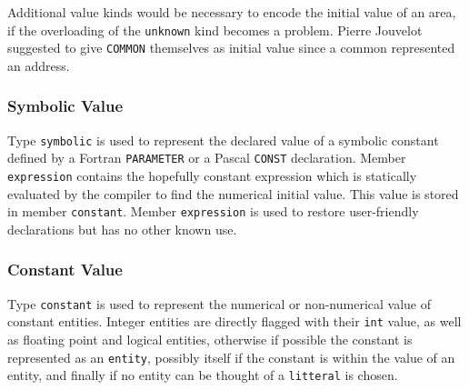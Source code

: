 \documentclass[a4paper]{article}
\begin{document}
Additional value kinds would be necessary to encode the initial value of
an area, if the overloading of the \verb+unknown+ kind becomes a
problem. Pierre Jouvelot suggested to give \verb+COMMON+ themselves as
initial value since a common represented an address.

\subsubsection{Symbolic Value}
\label{subsubsection-symbolic}

{}

Type \texttt{symbolic} is used to represent the declared value of a symbolic
constant defined by a Fortran \texttt{PARAMETER} or a Pascal \texttt{CONST}
declaration. Member \texttt{expression} contains the hopefully constant
expression which is statically evaluated by the compiler to find the
numerical initial value. This value is stored in member \texttt{constant}. 
Member \texttt{expression} is used to restore user-friendly
declarations but has no other known use. 

\begin{comment}
Le domaine \verb/symbolic/ est utilis� pour repr�senter la valeur
initiale d'une entit� constante symbolique, c'est-�-dire les PARAMETER
de Fortran ou les CONST de Pascal. Le sous-domaine \verb/expression/
permet de stocker l'expression qui a permis d'�valuer la valeur
initiale contenue dans le sous-domaine \verb/constant/. Le sous-domaine
\verb/expression/ n'est utile qui si on cherche � reproduire un texte
source fid�le.
\end{comment}

\subsubsection{Constant Value}
\label{subsubsection-constant}

{}

Type \texttt{constant} is used to represent the numerical or
non-numerical value of constant entities. Integer entities are
directly flagged with their \texttt{int} value, as well as floating
point and logical entities, otherwise if possible the constant is
represented as an \texttt{entity}, possibly itself if the constant is
within the value of an entity, and finally if no entity can be thought
of a \texttt{litteral} is chosen.
\end{document}
